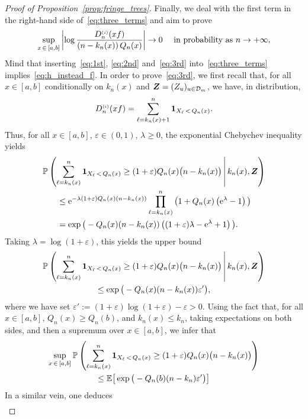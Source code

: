 \documentclass[10pt]{amsart}
\theoremstyle{definition}\newtheorem{defi}[theo]{Definition}\newtheorem{rema}[theo]{Remark}\newtheorem{exam}[theo]{Example}\newtheorem{exem}[theo]{Example}\newtheorem{nota}[theo]{Notation}
\newcommand{\bs}{\ensuremath{\boldsymbol}}
\newcommand{\sss}{\ensuremath{\scriptscriptstyle}}
\newcommand{\bbP}{\mathbb{P}}
\newcommand{\bbE}{\mathbb{E}}
\newcommand{\clD}{\mathcal{D}}
\newcommand{\rme}{\mathrm{e}}
\begin{document}
\begin{proof}[Proof of Proposition~\ref{prop:fringe_trees}]
Finally, we deal with the first term in the right-hand side of~\eqref{eq:three_terms} and aim to prove
\begin{equation}\label{eq:3rd}
\sup_{x\,\in\,[a,b]}\left|\log \frac{D_n^{\sss (i)}(xf)}{\left(n-k_n(x)\right)Q_n(x)}\right| \to 0\quad\text{ in probability as }n\to+\infty,
\end{equation}
Mind that inserting~\eqref{eq:1st}, \eqref{eq:2nd} and~\eqref{eq:3rd} into~\eqref{eq:three_terms} implies~\eqref{eq:h_instead_f}. In order to prove~\eqref{eq:3rd}, we first recall that, for all $x\in[a,b]$ conditionally on $k_n(x)$ and $\bs Z = (Z_u)_{u\in\clD_m}$, we have, in distribution,
\[
D_n^{\sss (i)}(xf) = \sum_{\ell=k_n(x)+1}^n \bs1_{X_\ell\,<\,Q_n(x)}.
\]
Thus, for all $x\in [a,b]$, $\varepsilon\in(0,1)$, $\lambda\geq 0$, the exponential Chebychev inequality yields
\begin{multline*}
\bbP\left(\sum_{\ell=k_n(x)}^n \bs1_{X_\ell\,< \,Q_n(x)}\geq (1+\varepsilon)Q_n(x)\big(n-k_n(x)\big)\,\middle|\, k_n(x), \bs Z\right)\\
\begin{aligned}
&\leq \rme^{-\lambda(1+\varepsilon)Q_n(x)(n-k_n(x))}
\prod_{\ell=k_n(x)}^n\big(1+Q_n(x)\left(\rme^\lambda-1\right)\big)\\
&= \exp\big(-Q_n(x)(n-k_n(x))\left((1+\varepsilon) \lambda -\rme^{\lambda}+1\right)\big).
\end{aligned}
\end{multline*}
Taking $\lambda = \log(1+\varepsilon)$, this yields the upper bound
\begin{multline*}
\bbP\left(\sum_{\ell=k_n(x)}^n \bs1_{X_\ell\,<\,Q_n(x)}\geq (1+\varepsilon)Q_n(x)\big(n-k_n(x)\big)\,\middle|\, k_n(x), \bs Z\right)\\
\leq\exp\big(-Q_n(x)(n-k_n(x))\varepsilon'\big),
\end{multline*}
where we have set $\varepsilon':=(1+\varepsilon)\log(1+\varepsilon) - \varepsilon>0$. Using the fact that, for all $x\in[a,b]$, $Q_n(x)\geq Q_n(b)$, and $k_n(x)\leq k_n$, taking expectations on both sides, and then a supremum over $x\in[a,b]$, we infer that
\begin{multline*}
\sup_{x\,\in\,[a,b]}
\bbP\left(\sum_{\ell=k_n(x)}^n \bs1_{X_\ell\,< \,Q_n(x)}\geq (1+\varepsilon)Q_n(x)\big(n-k_n(x)\big)\right) \\
\leq\bbE\big[\exp\big(-Q_n(b)(n-k_n)\varepsilon'\big)\big]
\end{multline*}
In a similar vein, one deduces
\begin{multline*}

\end{multline*}
\end{proof}
\end{document}

